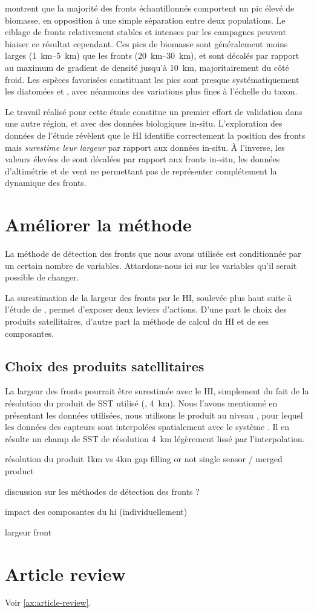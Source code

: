 \Textcite{mangolte_2023} montrent que la majorité des fronts échantillonnés comportent un pic élevé de biomasse, en opposition à une simple séparation entre deux populations.
Le ciblage de fronts relativement stables et intenses par les campagnes peuvent biaiser ce résultat cependant.
Ces pics de biomasse sont généralement moins larges (\qtyrange{1}{5}{\km}) que les fronts (\qtyrange{20}{30}{\km}), et sont décalés par rapport au maximum de gradient de densité jusqu'à \qty{10}{\km}, majoritairement du côté froid.
Les espèces favorisées constituant les pics sont presque systématiquement les diatomées et , avec néanmoins des variations plus fines à l'échelle du taxon.

Le travail réalisé pour cette étude  constitue un premier effort de validation dans une autre région, et avec des données biologiques in-situ.
L'exploration des données de l'étude révèlent que le HI identifie correctement la position des fronts mais \emph{surestime leur largeur} par rapport aux données in-situ.
À l'inverse, les valeurs élevées de  sont décalées par rapport aux fronts in-situ, les données d'altimétrie et de vent ne permettant pas de représenter complétement la dynamique des fronts.


\section{Améliorer la méthode}

La méthode de détection des fronts que nous avons utilisée  est conditionnée par un certain nombre de variables.
Attardons-nous ici sur les variables qu'il serait possible de changer.

La surestimation de la largeur des fronts par le HI, soulevée plus haut suite à l'étude de \textcite{mangolte_2023}, permet d'exposer deux leviers d'actions. D'une part le choix des produits satellitaires, d'autre part la méthode de calcul du HI et de ses composantes.

\subsection{Choix des produits satellitaires}

La largeur des fronts pourrait être surestimée avec le HI, simplement du fait de la résolution du produit de SST utilisé (, \qty{4}{\km}).
Nous l'avons mentionné en présentant les données utilisées, nous utilisons le produit  au niveau , pour lequel les données des capteurs sont interpolées spatialement avec le système .
Il en résulte un champ de SST de résolution \qty{4}{\km} légèrement lissé par l'interpolation.

résolution du produit
1km vs 4km
gap filling or not
single sensor / merged product

discussion sur les méthodes de détection des fronts ?

impact des composantes du hi (individuellement)

largeur front


\section{Article review}
\label{sec:review}

Voir \cref{ax:article-review}.
